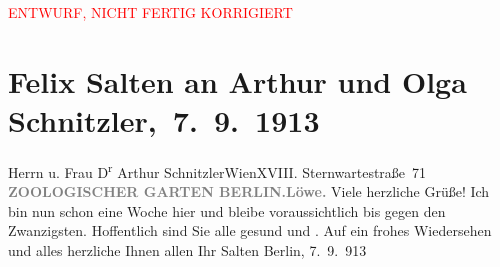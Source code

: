 
\begin{center}
            \textcolor{red}{ENTWURF, NICHT FERTIG KORRIGIERT}
                      \end{center}
            
         
         \renewcommand{\erwaehntePersonen}{Personen: Felix Salten, Olga Schnitzler, Heinrich Schnitzler}
         \renewcommand{\erwaehnteOrte}{Orte: Berlin, Charlottenburg, Sternwartestraße 71, Wien, Zoologischer Garten Berlin}
         \renewcommand{\erwaehnteWerke}{}
               \section[ Felix Salten an Arthur und Olga Schnitzler, 7. 9. 1913]{ Felix Salten an Arthur und Olga Schnitzler, 7. 9. 1913}\nopagebreak{}\rehead{ }\begin{ledgroupsized}[t]{13cm}\normalsize\beginnumbering \toendnotes[C]{\smallbreak\pagebreak[2]} 
\toendnotes[C]{\smallbreak}\pstart{}{\pb}Herrn u. Frau D\textsuperscript{r} Arthur Schnitzler\pend{}\pstart{}Wien\pend{}\pstart{}XVIII. Sternwartestraße 71\pend{}{\bigskip}\pstart
           \noindent{}{\pb}\textcolor{gray}{\textbf{ZOOLOGISCHER GARTEN BERLIN.}}\hfill \textcolor{gray}{\textbf{Löwe.}}\pend
           \pstart
           {\pb}Viele herzliche Grüße!\pend
           \pstart
           Ich bin nun schon eine Woche hier und bleibe
               voraussichtlich bis gegen den Zwanzigsten. Hoffentlich
               sind Sie alle gesund und \label{K_L03562-1v}\label{K_L03562-1h}. Auf ein frohes Wiedersehen und alles herzliche Ihnen allen\pend
           \pstart Ihr \spacefill\mbox{Salten}\pend{}\pstart
           Berlin, 7. 9. 913\pend
           
         
         \endnumbering{}\end{ledgroupsized}  \newcommand{\dateiname}{L03562}\newcommand{\titel}{Felix Salten an Arthur und Olga Schnitzler, 7. 9. 1913}\newcommand{\editorInnen}{Martin Anton Müller und Laura Untner}
      
